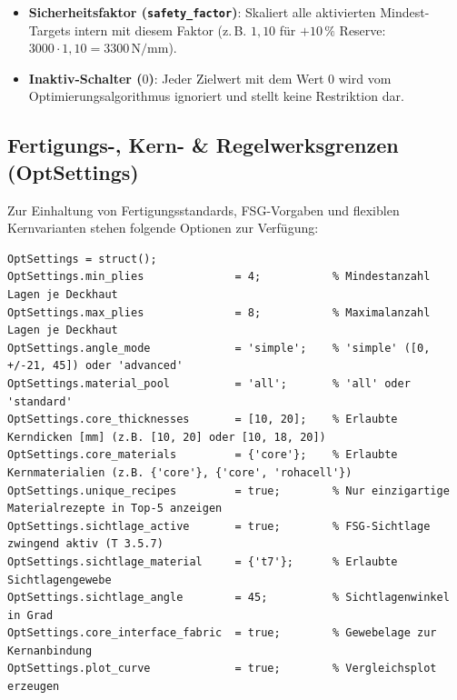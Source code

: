 \begin{itemize}
    \item \textbf{Sicherheitsfaktor (\texttt{safety\_factor})}: Skaliert alle aktivierten Mindest-Targets intern mit diesem Faktor (z.\,B. $1{,}10$ für $+10\,\%$ Reserve: $3000 \cdot 1{,}10 = 3300\,\text{N/mm}$).
    \item \textbf{Inaktiv-Schalter ($0$)}: Jeder Zielwert mit dem Wert $0$ wird vom Optimierungsalgorithmus ignoriert und stellt keine Restriktion dar.
\end{itemize}

\subsection*{Fertigungs-, Kern- \& Regelwerksgrenzen (OptSettings)}
Zur Einhaltung von Fertigungsstandards, FSG-Vorgaben und flexiblen Kernvarianten stehen folgende Optionen zur Verfügung:

\begin{lstlisting}[style=vscodeLightMatlab]
OptSettings = struct();
OptSettings.min_plies              = 4;           % Mindestanzahl Lagen je Deckhaut
OptSettings.max_plies              = 8;           % Maximalanzahl Lagen je Deckhaut
OptSettings.angle_mode             = 'simple';    % 'simple' ([0, +/-21, 45]) oder 'advanced'
OptSettings.material_pool          = 'all';       % 'all' oder 'standard'
OptSettings.core_thicknesses       = [10, 20];    % Erlaubte Kerndicken [mm] (z.B. [10, 20] oder [10, 18, 20])
OptSettings.core_materials         = {'core'};    % Erlaubte Kernmaterialien (z.B. {'core'}, {'core', 'rohacell'})
OptSettings.unique_recipes         = true;        % Nur einzigartige Materialrezepte in Top-5 anzeigen
OptSettings.sichtlage_active       = true;        % FSG-Sichtlage zwingend aktiv (T 3.5.7)
OptSettings.sichtlage_material     = {'t7'};      % Erlaubte Sichtlagengewebe
OptSettings.sichtlage_angle        = 45;          % Sichtlagenwinkel in Grad
OptSettings.core_interface_fabric  = true;        % Gewebelage zur Kernanbindung
OptSettings.plot_curve             = true;        % Vergleichsplot erzeugen
\end{lstlisting}

